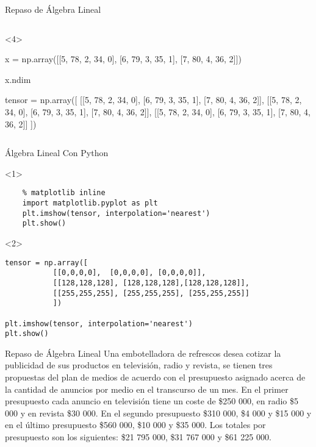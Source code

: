 \begin{frame}[fragile]{Repaso de Álgebra Lineal}
\begin{columns}[t]
  \begin{onlyenv}<4>
    \begin{ipythonnb}
x = np.array([[5, 78, 2, 34, 0],
              [6, 79, 3, 35, 1],
              [7, 80, 4, 36, 2]])

x.ndim
\end{ipythonnb}

      \begin{ipythonnb}
        tensor = np.array([
        [[5, 78, 2, 34, 0],
         [6, 79, 3, 35, 1],
         [7, 80, 4, 36, 2]],
        [[5, 78, 2, 34, 0],
         [6, 79, 3, 35, 1],
         [7, 80, 4, 36, 2]],
        [[5, 78, 2, 34, 0],
         [6, 79, 3, 35, 1],
         [7, 80, 4, 36, 2]]
        ])
\end{ipythonnb}
\end{onlyenv}

  \end{columns}
\end{frame}



\begin{frame}[fragile]{Álgebra Lineal Con Python}
  \begin{onlyenv}<1>
      \begin{lstlisting}
    % matplotlib inline
    import matplotlib.pyplot as plt
    plt.imshow(tensor, interpolation='nearest')
    plt.show()
  \end{lstlisting}
\end{onlyenv}

\begin{onlyenv}<2>
  \begin{lstlisting}
tensor = np.array([
		   [[0,0,0,0],  [0,0,0,0], [0,0,0,0]],
		   [[128,128,128], [128,128,128],[128,128,128]],
		   [[255,255,255], [255,255,255], [255,255,255]]
		   ])              

plt.imshow(tensor, interpolation='nearest')
plt.show()
  \end{lstlisting}
               \end{onlyenv}

\end{frame}


\begin{frame}{Repaso de Álgebra Lineal}
  Una embotelladora de refrescos desea cotizar la publicidad de sus productos en televisión,
radio y revista, se tienen tres propuestas del plan de medios de acuerdo con el presupuesto
asignado acerca de la cantidad de anuncios por medio en el transcurso de un mes. En el
primer presupuesto cada anuncio en televisión tiene un coste de \$250 000, en radio \$5 000
y en revista \$30 000. En el segundo presupuesto \$310 000, \$4 000 y \$15 000 y en el último
presupuesto \$560 000, \$10 000 y \$35 000. Los totales por presupuesto son los siguientes:
\$21 795 000, \$31 767 000 y \$61 225 000.
\end{frame}

